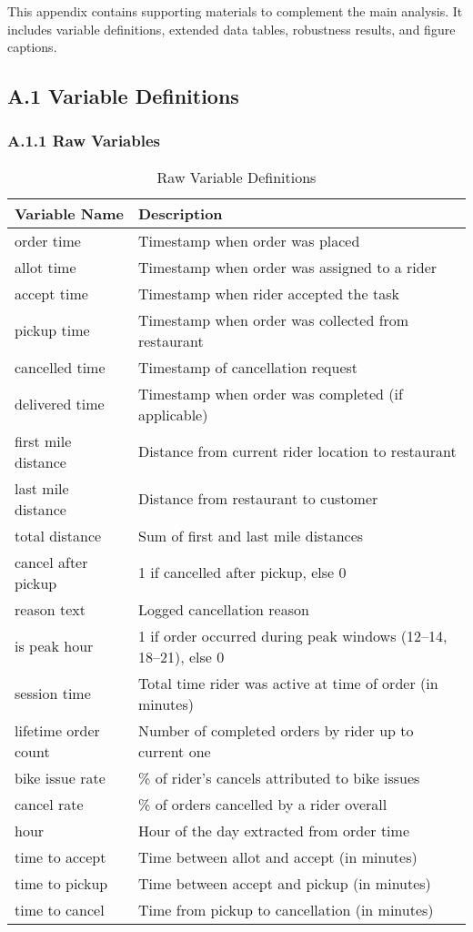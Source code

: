 \documentclass[12pt,letterpaper]{article}
\begin{document}
This appendix contains supporting materials to complement the main analysis. It includes variable definitions, extended data tables, robustness results, and figure captions.

\subsection*{A.1 Variable Definitions}
\subsubsection*{A.1.1 Raw Variables}

\begin{table}[H]
\centering
\caption{Raw Variable Definitions}
\label{tab:raw_vars}
\begin{tabular}{p{4cm} p{10cm}}
\toprule
\textbf{Variable Name} & \textbf{Description} \\
\midrule
order time & Timestamp when order was placed \\
allot time & Timestamp when order was assigned to a rider \\
accept time & Timestamp when rider accepted the task \\
pickup time & Timestamp when order was collected from restaurant \\
cancelled time & Timestamp of cancellation request \\
delivered time & Timestamp when order was completed (if applicable) \\
first mile distance & Distance from current rider location to restaurant \\
last mile distance & Distance from restaurant to customer \\
total distance & Sum of first and last mile distances \\
cancel after pickup & 1 if cancelled after pickup, else 0 \\
reason text & Logged cancellation reason \\
is peak hour & 1 if order occurred during peak windows (12--14, 18--21), else 0 \\
session time & Total time rider was active at time of order (in minutes) \\
lifetime order count & Number of completed orders by rider up to current one \\
bike issue rate & \% of rider's cancels attributed to bike issues \\
cancel rate & \% of orders cancelled by a rider overall \\
hour & Hour of the day extracted from order time \\
time to accept & Time between allot and accept (in minutes) \\
time to pickup & Time between accept and pickup (in minutes) \\
time to cancel & Time from pickup to cancellation (in minutes) \\
\bottomrule
\end{tabular}
\end{table}
\end{document}
